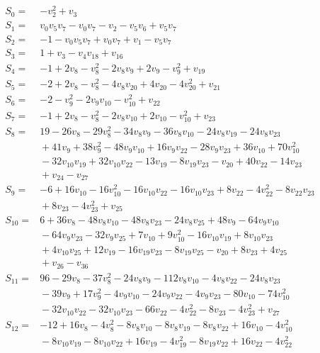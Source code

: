 \begingroup\small\setlength{\jot}{3pt}
\begin{align*}
S_{0}={}&-v_{2}^{2}+v_{3}\\
S_{1}={}&v_{0}v_{5}v_{7}-v_{0}v_{7}-v_{2}-v_{5}v_{6}+v_{5}v_{7}\\
S_{2}={}&-1-v_{0}v_{5}v_{7}+v_{0}v_{7}+v_{1}-v_{5}v_{7}\\
S_{3}={}&1+v_{3}-v_{4}v_{18}+v_{16}\\
S_{4}={}&-1+2v_{8}-v_{8}^{2}-2v_{8}v_{9}+2v_{9}-v_{9}^{2}+v_{19}\\
S_{5}={}&-2+2v_{8}-v_{8}^{2}-4v_{8}v_{20}+4v_{20}-4v_{20}^{2}+v_{21}\\
S_{6}={}&-2-v_{9}^{2}-2v_{9}v_{10}-v_{10}^{2}+v_{22}\\
S_{7}={}&-1+2v_{8}-v_{8}^{2}-2v_{8}v_{10}+2v_{10}-v_{10}^{2}+v_{23}\\
S_{8}={}&19-26v_{8}-29v_{8}^{2}-34v_{8}v_{9}-36v_{8}v_{10}-24v_{8}v_{19}-24v_{8}v_{23}\\
&{}+41v_{9}+38v_{9}^{2}-48v_{9}v_{10}+16v_{9}v_{22}-28v_{9}v_{23}+36v_{10}+70v_{10}^{2}\\
&{}-32v_{10}v_{19}+32v_{10}v_{22}-13v_{19}-8v_{19}v_{23}-v_{20}+40v_{22}-14v_{23}\\
&{}+v_{24}-v_{27}\\
S_{9}={}&-6+16v_{10}-16v_{10}^{2}-16v_{10}v_{22}-16v_{10}v_{23}+8v_{22}-4v_{22}^{2}-8v_{22}v_{23}\\
&{}+8v_{23}-4v_{23}^{2}+v_{25}\\
S_{10}={}&6+36v_{8}-48v_{8}v_{10}-48v_{8}v_{23}-24v_{8}v_{25}+48v_{9}-64v_{9}v_{10}\\
&{}-64v_{9}v_{23}-32v_{9}v_{25}+7v_{10}+9v_{10}^{2}-16v_{10}v_{19}+8v_{10}v_{23}\\
&{}+4v_{10}v_{25}+12v_{19}-16v_{19}v_{23}-8v_{19}v_{25}-v_{20}+8v_{23}+4v_{25}\\
&{}+v_{26}-v_{36}\\
S_{11}={}&96-29v_{8}-37v_{8}^{2}-24v_{8}v_{9}-112v_{8}v_{10}-4v_{8}v_{22}-24v_{8}v_{23}\\
&{}-39v_{9}+17v_{9}^{2}-4v_{9}v_{10}-24v_{9}v_{22}-4v_{9}v_{23}-80v_{10}-74v_{10}^{2}\\
&{}-32v_{10}v_{22}-32v_{10}v_{23}-66v_{22}-4v_{22}^{2}-8v_{23}-4v_{23}^{2}+v_{27}\\
S_{12}={}&-12+16v_{8}-4v_{8}^{2}-8v_{8}v_{10}-8v_{8}v_{19}-8v_{8}v_{22}+16v_{10}-4v_{10}^{2}\\
&{}-8v_{10}v_{19}-8v_{10}v_{22}+16v_{19}-4v_{19}^{2}-8v_{19}v_{22}+16v_{22}-4v_{22}^{2}\\

\end{align*}
